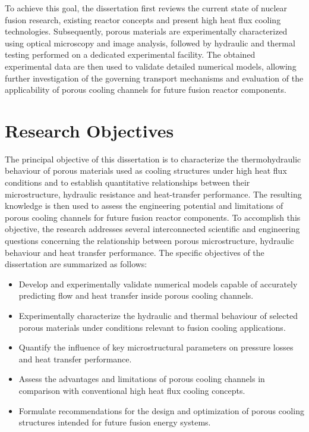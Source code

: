 \documentclass[a4paper]{article}
\begin{document}
To achieve this goal, the dissertation first reviews the current state of nuclear fusion research, existing reactor concepts and present high heat flux cooling technologies. Subsequently, porous materials are experimentally characterized using optical microscopy and image analysis, followed by hydraulic and thermal testing performed on a dedicated experimental facility. The obtained experimental data are then used to validate detailed numerical models, allowing further investigation of the governing transport mechanisms and evaluation of the applicability of porous cooling channels for future fusion reactor components.

\section{Research Objectives}

The principal objective of this dissertation is to characterize the thermohydraulic behaviour of porous materials used as cooling structures under high heat flux conditions and to establish quantitative relationships between their microstructure, hydraulic resistance and heat-transfer performance. The resulting knowledge is then used to assess the engineering potential and limitations of porous cooling channels for future fusion reactor components. To accomplish this objective, the research addresses several interconnected scientific and engineering questions concerning the relationship between porous microstructure, hydraulic behaviour and heat transfer performance. The specific objectives of the dissertation are summarized as follows:

\begin{itemize}
    \item Develop and experimentally validate numerical models capable of accurately predicting flow and heat transfer inside porous cooling channels.
    
    \item Experimentally characterize the hydraulic and thermal behaviour of selected porous materials under conditions relevant to fusion cooling applications.
    
    \item Quantify the influence of key microstructural parameters on pressure losses and heat transfer performance.
    
    \item Assess the advantages and limitations of porous cooling channels in comparison with conventional high heat flux cooling concepts.
    
    \item Formulate recommendations for the design and optimization of porous cooling structures intended for future fusion energy systems.
\end{itemize}
\end{document}
